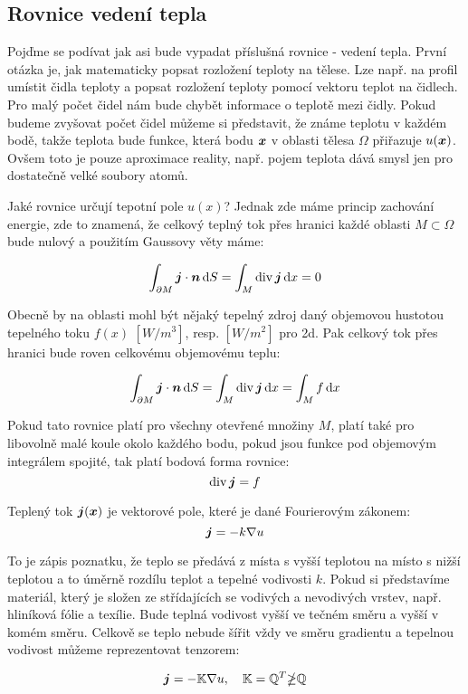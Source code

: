 \subsection{Rovnice vedení tepla}
Pojďme se podívat jak asi bude vypadat příslušná rovnice - vedení tepla. 
První otázka je, jak matematicky popsat rozložení teploty na tělese. Lze např. 
na profil umístit čidla teploty a popsat rozložení teploty pomocí vektoru teplot 
na čidlech. Pro malý počet čidel nám bude chybět informace o teplotě mezi čidly. 
Pokud budeme zvyšovat počet čidel můžeme si představit, že známe teplotu v každém 
bodě, takže teplota bude funkce, která bodu $\mathbf{\boldsymbol{x}}$ v oblasti tělesa $\Omega$ přiřazuje 
$u(\mathbf{\boldsymbol{x}})$. Ovšem toto je pouze aproximace reality, např. pojem teplota dává smysl jen 
pro dostatečně velké soubory atomů.

Jaké rovnice určují tepotní pole $u(x)$? Jednak zde máme princip zachování energie,
zde to znamená, že celkový teplný tok přes hranici každé oblasti $M \subset \Omega$
bude nulový a použitím Gaussovy věty máme:

\[
    \int_{\partial M} \mathbf{\boldsymbol{j}} \cdot \mathbf{\boldsymbol{n}} \,{\rm d} S = \int_{M} \operatorname{div} \mathbf{\boldsymbol{j}} \,{\rm d} x = 0
\]

Obecně by na oblasti mohl být nějaký tepelný zdroj daný objemovou hustotou
tepelného toku $f(x)$ $[W/m^3]$, resp. $[W/m^2]$ pro 2d. Pak celkový tok přes hranici 
bude roven celkovému objemovému teplu:

\[
    \int_{\partial M} \mathbf{\boldsymbol{j}} \cdot \mathbf{\boldsymbol{n}} \,{\rm d} S = \int_{M} \operatorname{div} \mathbf{\boldsymbol{j}} \,{\rm d} x = \int_{M} f \,{\rm d} x
\]

Pokud tato rovnice platí pro všechny otevřené množiny $M$, platí také pro libovolně malé koule 
okolo každého bodu, pokud jsou funkce pod objemovým integrálem spojité, tak platí bodová 
forma rovnice:
\[
    \operatorname{div} \mathbf{\boldsymbol{j}} = f
\]


Teplený tok $\mathbf{\boldsymbol{j}}(\mathbf{\boldsymbol{x}})$ je vektorové pole, které je dané Fourierovým zákonem:
\[
   \mathbf{\boldsymbol{j}} = - k \nabla u 
\]

To je zápis poznatku, že teplo se předává z místa s vyšší teplotou na místo s nižší 
teplotou a to úměrně rozdílu teplot a tepelné vodivosti $k$. Pokud si představíme 
materiál, který je složen ze střídajících se vodivých a nevodivých vrstev, 
např. hliníková fólie a texílie. Bude teplná vodivost vyšší ve tečném směru a 
vyšší v komém směru. Celkově se teplo nebude šířit vždy ve směru 
gradientu a tepelnou vodivost můžeme reprezentovat tenzorem:

\[
   \mathbf{\boldsymbol{j}} = -{\mathbb{K}} \nabla u,\quad {\mathbb{K}} = {\mathbb{Q}}^T {\mathbb{ \Lambda}} {\mathbb{Q}}
\]

